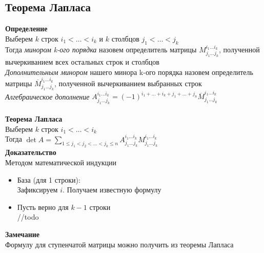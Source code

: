 \documentclass[12pt]{article}
\begin{document}
\subsection{Теорема Лапласа}
\textbf{Определение}\\
Выберем $k$ строк $i_1 < \ldots < i_k$ и $k$ столбцов $j_1 < \ldots < j_k$\\
Тогда \textit{минором k-ого порядка} назовем определитель матрицы $M_{j_1\ldots j_k}^{i_1\ldots i_k}$, полученной вычеркиванием всех остальных строк и столбцов\\
\textit{Дополнительным минором} нашего минора k-ого порядка назовем определитель матрицы $\overline{M}_{j_1\ldots j_k}^{i_1\ldots i_k}$, полученной вычеркиванием выбранных строк\\
\textit{Алгебраическое дополнение} $A_{j_1\ldots j_k}^{i_1\ldots i_k} = (-1)^{i_1+\ldots+i_k+j_1+\ldots+j_n}\overline{M}_{j_1\ldots j_k}^{i_1\ldots i_k}$\\\\
\textbf{Теорема Лапласа}\\
Выберем $k$ строк $i_1 < \ldots < i_k$\\
Тогда $\det A = \sum_{1 \leq j_1 < j_2 < \ldots < j_k \leq n} A_{j_1\ldots j_k}^{i_1\ldots i_k}M_{j_1\ldots j_k}^{i_1\ldots i_k}$\\
\textbf{Доказательство}\\
Методом математической индукции
\begin{itemize}
    \item База (для 1 строки):\\
    Зафиксируем $i$. Получаем известную формулу
    \item Пусть верно для $k-1$ строки\\
    //todo
\end{itemize}
\textbf{Замечание}\\
Формулу для ступенчатой матрицы можно получить из теоремы Лапласа\\
\end{document}
